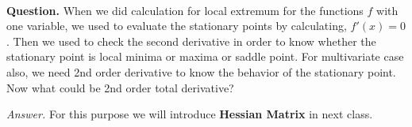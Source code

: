 \documentclass[../Analysis-3.tex]{subfiles}
\begin{document}
\

\textbf{Question.} When we did calculation for local extremum for the functions $f$ with one variable, we used to evaluate the stationary points by calculating, $f'(x) =0$. Then we used to check the second derivative in order to know whether the stationary point is local minima or maxima or saddle point. For multivariate case also, we need 2nd order derivative to know the behavior of the stationary point. Now what could be 2nd order total derivative?

\ssk

\textit{Answer.} For this purpose we will introduce \textbf{Hessian Matrix} in next class.
\end{document}
